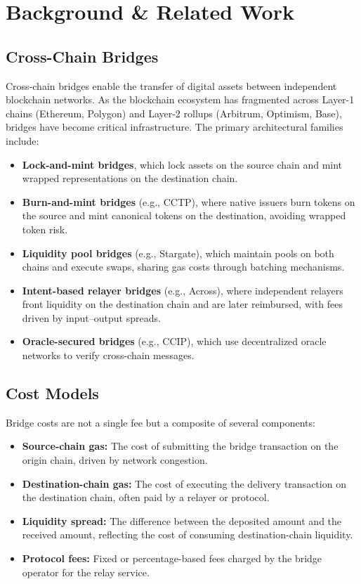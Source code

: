 \section{Background \& Related Work}\label{sec: background_rw}

\subsection{Cross-Chain Bridges}
Cross-chain bridges enable the transfer of digital assets between independent blockchain networks. As the blockchain ecosystem has fragmented across Layer-1 chains (Ethereum, Polygon) and Layer-2 rollups (Arbitrum, Optimism, Base), bridges have become critical infrastructure. The primary architectural families include:

\begin{itemize}
    \item \textbf{Lock-and-mint bridges}, which lock assets on the source chain and mint wrapped representations on the destination chain.
    \item \textbf{Burn-and-mint bridges} (e.g., CCTP), where native issuers burn tokens on the source and mint canonical tokens on the destination, avoiding wrapped token risk.
    \item \textbf{Liquidity pool bridges} (e.g., Stargate), which maintain pools on both chains and execute swaps, sharing gas costs through batching mechanisms.
    \item \textbf{Intent-based relayer bridges} (e.g., Across), where independent relayers front liquidity on the destination chain and are later reimbursed, with fees driven by input--output spreads.
    \item \textbf{Oracle-secured bridges} (e.g., CCIP), which use decentralized oracle networks to verify cross-chain messages.
\end{itemize}

\subsection{Cost Models}
Bridge costs are not a single fee but a composite of several components:
\begin{itemize}
    \item \textbf{Source-chain gas:} The cost of submitting the bridge transaction on the origin chain, driven by network congestion.
    \item \textbf{Destination-chain gas:} The cost of executing the delivery transaction on the destination chain, often paid by a relayer or protocol.
    \item \textbf{Liquidity spread:} The difference between the deposited amount and the received amount, reflecting the cost of consuming destination-chain liquidity.
    \item \textbf{Protocol fees:} Fixed or percentage-based fees charged by the bridge operator for the relay service.
\end{itemize}

